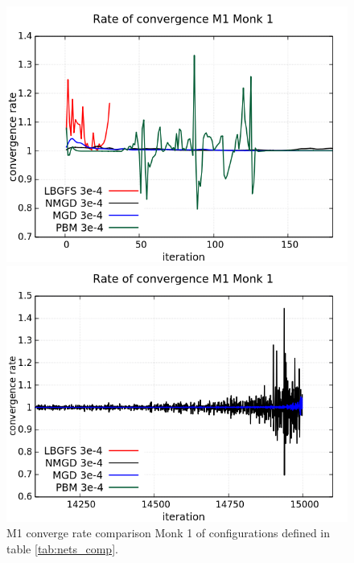 \begin{figure}[H]
	\centering
	\begin{minipage}[t]{0.525\linewidth}		
		\includegraphics[width=\linewidth]{data/Comparison/Monk1/Monk1_M1_CR_zoomLeft.png}
	\end{minipage}%
	\begin{minipage}[t]{0.525\linewidth}
		\includegraphics[width=\linewidth]{data/Comparison/Monk1/Monk1_M1_CR_zoomRight.png}
	\end{minipage}
	\caption{M1 converge rate comparison Monk 1 of configurations defined in table \ref{tab:nets_comp}.}
	\label{fig:CR-M1-Monk1-Zoom}
\end{figure}

